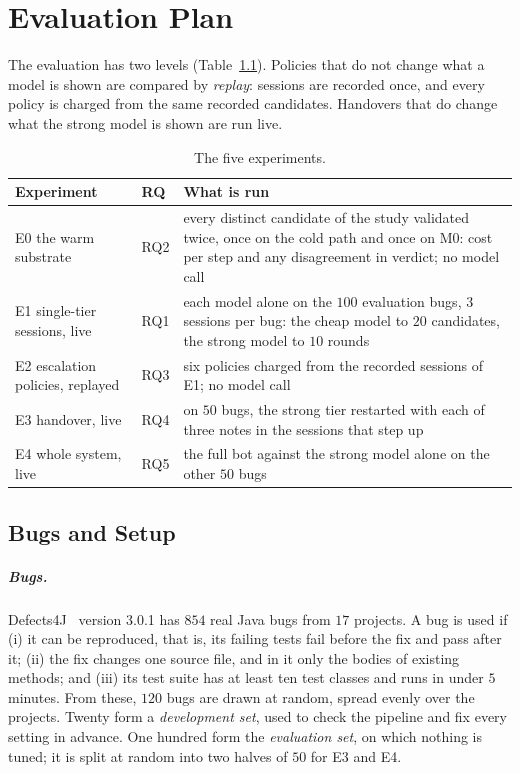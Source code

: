 \chapter{Evaluation Plan}
\label{ch:experiments}

The evaluation has two levels (Table~\ref{tab:exp-overview}). Policies that do
not change what a model is shown are compared by \emph{replay}: sessions are
recorded once, and every policy is charged from the same recorded candidates.
Handovers that do change what the strong model is shown are run live.

\begin{table}[htbp]
\centering
\caption{The five experiments.}
\label{tab:exp-overview}
\footnotesize
\begin{tabularx}{\textwidth}{@{}>{\raggedright\arraybackslash}p{} >{\raggedright\arraybackslash}p{} >{\raggedright\arraybackslash}X@{}}
\toprule
Experiment & RQ & What is run\\
\midrule
E0 the warm substrate & RQ2 & every distinct candidate of the study validated twice, once on the cold path and once on M0: cost per step and any disagreement in verdict; no model call\\
E1 single-tier sessions, live & RQ1 & each model alone on the $100$ evaluation bugs, $3$ sessions per bug: the cheap model to $20$ candidates, the strong model to $10$ rounds\\
E2 escalation policies, replayed & RQ3 & six policies charged from the recorded sessions of E1; no model call\\
E3 handover, live & RQ4 & on $50$ bugs, the strong tier restarted with each of three notes in the sessions that step up\\
E4 whole system, live & RQ5 & the full bot against the strong model alone on the other $50$ bugs\\
\bottomrule
\end{tabularx}
\end{table}

\section{Bugs and Setup}
\label{sec:exp-selection}

\paragraph{Bugs.} Defects4J~\citep{just2014defects4j} version 3.0.1 has $854$
real Java bugs from $17$ projects. A bug is used if (i) it can be reproduced,
that is, its failing tests fail before the fix and pass after it; (ii) the fix
changes one source file, and in it only the bodies of existing methods; and
(iii) its test suite has at least ten test classes and runs in under $5$
minutes. From these, $120$ bugs are drawn at random, spread evenly over the
projects. Twenty form a \emph{development set}, used to check the pipeline and
fix every setting in advance. One hundred form the \emph{evaluation set}, on
which nothing is tuned; it is split at random into two halves of $50$ for E3
and E4.

